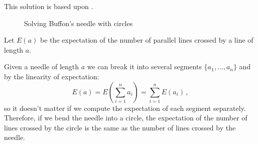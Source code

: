 

This solution is based upon \cite[Chapter~26]{proofs}.

\begin{figure}[tb]
\begin{center}
\end{center}
\caption{Solving Buffon's needle with circles}\label{f.buffon3}
\end{figure}

Let $E(a)$ be the expectation of the number of parallel lines crossed by a line of length $a$.

Given a needle of length $a$ we can break it into several segments $\{a_1,\ldots,a_n\}$ and by the linearity of expectation:
\[
E(a) = E\left(\sum_{i=1}^{n} a_i\right) = \sum_{i=1}^{n} E(a_i)\,, 
\]
so it doesn't matter if we compute the expectation of each segment separately. Therefore, if we bend the needle into a circle, the expectation of the number of lines crossed by the circle is the same as the number of lines crossed by the needle.

